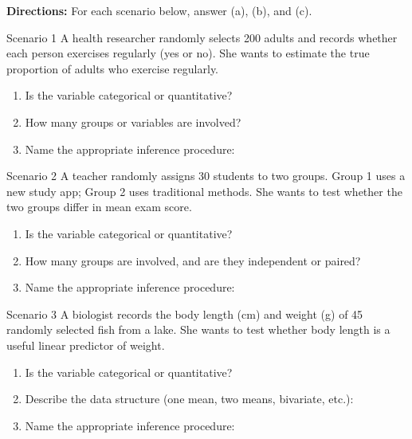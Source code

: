 \documentclass[10pt]{article}
\begin{document}
\namedateperiod

\vspace{0.1in}

\textbf{Directions:} For each scenario below, answer (a), (b), and (c).

\begin{notesbox}{Scenario 1}
A health researcher randomly selects 200 adults and records whether each person
exercises regularly (yes or no). She wants to estimate the true proportion of adults
who exercise regularly.

\vspace{0.1in}
\begin{enumerate}[label=(\alph*), itemsep=6pt]
  \item Is the variable categorical or quantitative? \blank{4cm}
  \item How many groups or variables are involved? \blank{4cm}
  \item Name the appropriate inference procedure: \blank{7cm}
\end{enumerate}
\end{notesbox}

\begin{notesbox}{Scenario 2}
A teacher randomly assigns 30 students to two groups. Group 1 uses a new study app;
Group 2 uses traditional methods. She wants to test whether the two groups differ in
mean exam score.

\vspace{0.1in}
\begin{enumerate}[label=(\alph*), itemsep=6pt]
  \item Is the variable categorical or quantitative? \blank{4cm}
  \item How many groups are involved, and are they independent or paired? \blank{4cm}
  \item Name the appropriate inference procedure: \blank{7cm}
\end{enumerate}
\end{notesbox}

\begin{notesbox}{Scenario 3}
A biologist records the body length (cm) and weight (g) of 45 randomly selected fish
from a lake. She wants to test whether body length is a useful linear predictor of
weight.

\vspace{0.1in}
\begin{enumerate}[label=(\alph*), itemsep=6pt]
  \item Is the variable categorical or quantitative? \blank{4cm}
  \item Describe the data structure (one mean, two means, bivariate, etc.): \blank{4cm}
  \item Name the appropriate inference procedure: \blank{7cm}
\end{enumerate}
\end{notesbox}
\end{document}
